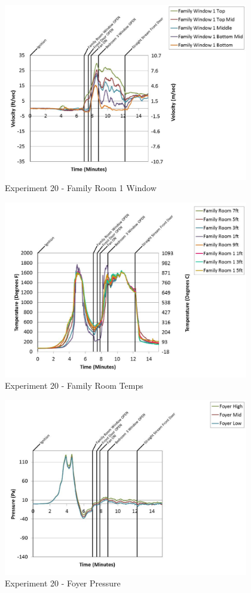 \documentclass{article}
\begin{document}
\begin{appendices}
	\clearpage

	\begin{figure}[h!]
		\centering
		\includegraphics[height=3.05in]{0_Images/Results_Charts/Exp_20_Charts/FamilyRoom1Window.pdf}
		\caption{Experiment 20 - Family Room 1 Window}
	\end{figure}
 

	\begin{figure}[h!]
		\centering
		\includegraphics[height=3.05in]{0_Images/Results_Charts/Exp_20_Charts/FamilyRoomTemps.pdf}
		\caption{Experiment 20 - Family Room Temps}
	\end{figure}
 
	\clearpage

	\begin{figure}[h!]
		\centering
		\includegraphics[height=3.05in]{0_Images/Results_Charts/Exp_20_Charts/FoyerPressure.pdf}
		\caption{Experiment 20 - Foyer Pressure}
	\end{figure}
 


\end{appendices}
\end{document}
